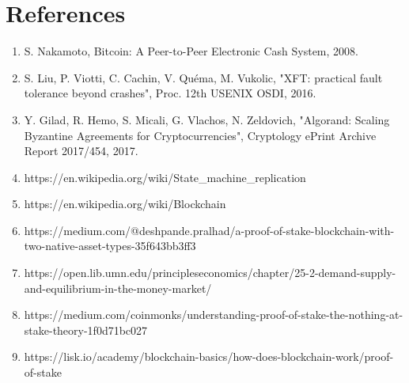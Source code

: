 \section{References}

\begin{enumerate}
    \item S. Nakamoto, Bitcoin: A Peer-to-Peer Electronic Cash System, 2008.
    \item S. Liu, P. Viotti, C. Cachin, V. Quéma, M. Vukolic, "XFT: practical fault tolerance beyond crashes", Proc. 12th USENIX OSDI, 2016.
    \item Y. Gilad, R. Hemo, S. Micali, G. Vlachos, N. Zeldovich, "Algorand: Scaling Byzantine Agreements for Cryptocurrencies", Cryptology ePrint Archive Report 2017/454, 2017.
    \item https://en.wikipedia.org/wiki/State\_machine\_replication
    \item https://en.wikipedia.org/wiki/Blockchain
    \item https://medium.com/@deshpande.pralhad/a-proof-of-stake-blockchain-with-two-native-asset-types-35f643bb3ff3
    \item https://open.lib.umn.edu/principleseconomics/chapter/25-2-demand-supply-and-equilibrium-in-the-money-market/
    \item https://medium.com/coinmonks/understanding-proof-of-stake-the-nothing-at-stake-theory-1f0d71bc027
    \item https://lisk.io/academy/blockchain-basics/how-does-blockchain-work/proof-of-stake
\end{enumerate}